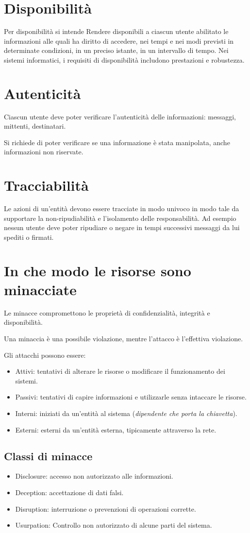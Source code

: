 \documentclass[oneside,a4paper,11pt]{book}
\theoremstyle{italicstyle}
\theoremstyle{normStyle}
\begin{document}
\section{Disponibilità}
Per disponibilità si intende Rendere disponibili a ciascun utente abilitato 
le informazioni alle quali ha diritto di accedere, nei tempi e nei modi previsti
in determinate condizioni, in un preciso istante, in un intervallo di tempo.
Nei sistemi informatici, i requisiti di disponibilità includono prestazioni e robustezza.
\section{Autenticità}
Ciascun utente deve poter verificare l'autenticità delle informazioni: messaggi, 
mittenti, destinatari.

Si richiede di poter verificare se una informazione è stata manipolata, anche informazioni non riservate.
\section{Tracciabilità}
Le azioni di un'entità devono essere tracciate in modo univoco in modo tale da supportare 
la non-ripudiabilità e l’isolamento delle responsabilità.
Ad esempio nessun utente deve poter ripudiare o negare in tempi 
successivi messaggi da lui spediti o firmati.
\section{In che modo le risorse sono minacciate}
Le minacce compromettono le proprietà di confidenzialità, integrità e disponibilità.

Una minaccia è una possibile violazione, mentre l'attacco è l'effettiva violazione.

Gli attacchi possono essere:
\begin{itemize}
  \item Attivi: tentativi di alterare le risorse o modificare il funzionamento dei sistemi.
  \item Passivi: tentativi di capire informazioni e utilizzarle senza intaccare le risorse.
  \item Interni: iniziati da un'entità al sistema (\textit{dipendente che porta la chiavetta}).
  \item Esterni: esterni da un'entità esterna, tipicamente attraverso la rete.
\end{itemize}
\subsection{Classi di minacce}
\begin{itemize}
  \item Disclosure: accesso non autorizzato alle informazioni.
  \item Deception: accettazione di dati falsi.
  \item Disruption: interruzione o prevenzioni di operazioni corrette.
  \item Usurpation: Controllo non autorizzato di alcune parti del sistema.
\end{itemize}
\end{document}
